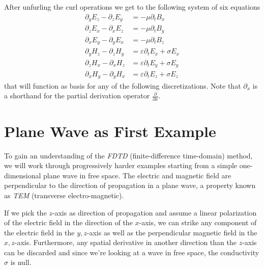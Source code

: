 \documentclass[]{report}
\begin{document}
After unfurling the curl operations we get to the following system of six equations
\begin{align}
	\partial_y E_z - \partial_z E_y &= -\mu \partial_t B_x \\
	\partial_z E_x - \partial_x E_z &= -\mu \partial_t B_y \\
	\partial_x E_y - \partial_y E_x &= -\mu \partial_t B_z \\
	\partial_y H_z - \partial_z H_y &= \varepsilon \partial_t E_x + \sigma E_x \\
	\partial_z H_x - \partial_x H_z &= \varepsilon \partial_t E_y + \sigma E_y \\
	\partial_x H_y - \partial_y H_x &= \varepsilon \partial_t E_z + \sigma E_z
\end{align}
that will function as basis for any of the following discretizations. Note that \(\partial_x\) is a shorthand for the partial derivation operator \(\frac{\partial}{\partial x}\).

\section{Plane Wave as First Example}
To gain an understanding of the \textit{FDTD} (finite-difference time-domain) method, we will work through progressively harder examples starting from a simple one-dimensional plane wave in free space. The electric and magnetic field are perpendicular to the direction of propagation in a plane wave, a property known as \textit{TEM} (transverse electro-magnetic).

If we pick the \(z\)-axis as direction of propagation and assume a linear polarization of the electric field in the direction of the \(x\)-axis, we can strike any component of the electric field in the \(y,z\)-axis as well as the perpendicular magnetic field in the \(x,z\)-axis. Furthermore, any spatial derivative in another direction than the \(z\)-axis can be discarded and since we're looking at a wave in free space, the conductivity \( \sigma \) is null.
\end{document}

